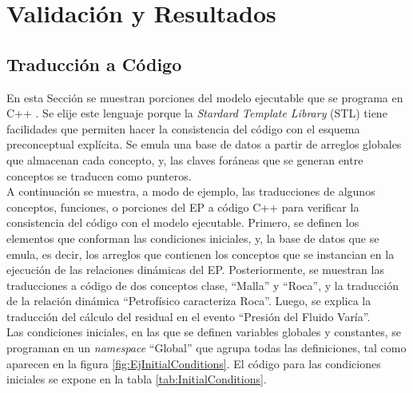\chapter{Validación y Resultados}\label{cap:Validacion}

\section{Traducción a Código}
En esta Sección se muestran porciones del modelo ejecutable que se programa en C++ \citep{ISO:2017:IIIa}. Se elije este lenguaje porque la \textit{Stardard Template Library} (STL) tiene facilidades que permiten hacer la consistencia del código con el esquema preconceptual explícita. Se emula una base de datos a partir de arreglos globales que almacenan cada concepto, y, las claves foráneas que se generan entre conceptos se traducen como punteros. \\

A continuación se muestra, a modo de ejemplo, las traducciones de algunos conceptos, funciones, o porciones del EP a código C++ para verificar la consistencia del código con el modelo ejecutable. Primero, se definen los elementos que conforman las condiciones iniciales, y, la base de datos que se emula, es decir, los arreglos que contienen los conceptos que se instancian en la ejecución de las relaciones dinámicas del EP. Posteriormente, se muestran las traducciones a código de dos conceptos clase, ``Malla'' y ``Roca'', y la traducción de la relación dinámica ``Petrofísico caracteriza Roca''. Luego, se explica la traducción del cálculo del residual en el evento ``Presión del Fluido Varía''.\\

Las condiciones iniciales, en las que se definen variables globales y constantes, se programan en un \textit{namespace} ``Global'' que agrupa todas las definiciones, tal como aparecen en la figura \ref{fig:EjInitialConditions}. El código para las condiciones iniciales se expone en la tabla \ref{tab:InitialConditions}.\\

